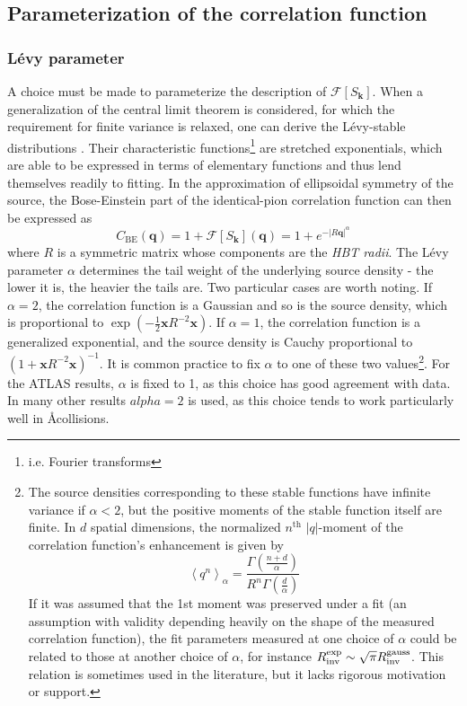 \subsection{Parameterization of the correlation function}

\subsubsection{L\'evy parameter}

A choice must be made to parameterize the description of $\mathcal{F}[S_\mathbf{k}]$.
When a generalization of the central limit theorem is considered, for which the requirement for finite variance is relaxed, one can derive the L\'evy-stable distributions \cite{Csorgo:2003uv}.
Their characteristic functions\footnote{i.e. Fourier transforms} are stretched exponentials, which are able to be expressed in terms of elementary functions and thus lend themselves readily to fitting.
In the approximation of ellipsoidal symmetry of the source, the Bose-Einstein part of the identical-pion correlation function can then be expressed as
\begin{equation} C_{\textrm{BE}}(\mathbf{q}) = 1 + \mathcal{F}[S_\mathbf{k}](\mathbf{q}) = 1 + e^{- \left|R \mathbf{q} \right|^{\alpha} } \end{equation}
where $R$ is a symmetric matrix whose components are the \emph{HBT radii}.
The L\'evy parameter $\alpha$ determines the tail weight of the underlying source density - the lower it is, the heavier the tails are.
Two particular cases are worth noting.
If $\alpha = 2$, the correlation function is a Gaussian and so is the source density, which is proportional to \( \exp\left(-\frac{1}{2} \mathbf{x} R^{-2} \mathbf{x}\right) \).
If $\alpha = 1$, the correlation function is a generalized exponential, and the source density is Cauchy proportional to \( \left( 1 + \mathbf{x} R^{-2} \mathbf{x} \right)^{-1} \).
It is common practice to fix $\alpha$ to one of these two values\footnote{The source densities corresponding to these stable functions have infinite variance if $\alpha < 2$, but the positive moments of the stable function itself are finite.
In $d$ spatial dimensions, the normalized $n^\textrm{th}$ $|q|$-moment of the correlation function's enhancement is given by
\begin{equation}
\left< q^n \right>_{\alpha} = \frac{\Gamma\left(\frac{n+d}{\alpha}\right)}{R^n \Gamma\left(\frac{d}{\alpha}\right)}
\end{equation}
If it was assumed that the 1st moment was preserved under a fit (an assumption with validity depending heavily on the shape of the measured correlation function), the fit parameters measured at one choice of $\alpha$ could be related to those at another choice of $\alpha$, for instance $R_{\mathrm{inv}}^{\textrm{exp}} \sim \sqrt{\pi} R_{\mathrm{inv}}^{\textrm{gauss}}$.
This relation is sometimes used in the literature, but it lacks rigorous motivation or support.}.
For the ATLAS \pPb results, $\alpha$ is fixed to 1, as this choice has good agreement with data.
In many other results $alpha = 2$ is used, as this choice tends to work particularly well in \AA collisions.

